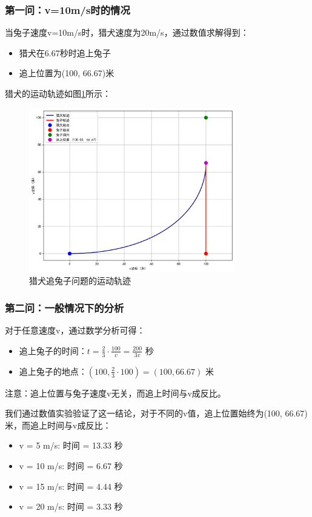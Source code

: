 \documentclass[bwprint]{cumcmthesis}
\begin{document}
\subsubsection{第一问：v=10m/s时的情况}
当兔子速度v=10m/s时，猎犬速度为20m/s，通过数值求解得到：
\begin{itemize}
    \item 猎犬在6.67秒时追上兔子
    \item 追上位置为(100, 66.67)米
\end{itemize}

猎犬的运动轨迹如图\ref{fig:dog_rabbit}所示：

\begin{figure}[htbp]
    \centering
    \includegraphics[width=0.8\textwidth]{figures/2.png}
    \caption{猎犬追兔子问题的运动轨迹}
    \label{fig:dog_rabbit}
\end{figure}

\subsubsection{第二问：一般情况下的分析}
对于任意速度v，通过数学分析可得：
\begin{itemize}
    \item 追上兔子的时间：$t = \frac{2}{3} \cdot \frac{100}{v} = \frac{200}{3v}$ 秒
    \item 追上兔子的地点：$(100, \frac{2}{3} \cdot 100) = (100, 66.67)$ 米
\end{itemize}

注意：追上位置与兔子速度v无关，而追上时间与v成反比。

我们通过数值实验验证了这一结论，对于不同的v值，追上位置始终为(100, 66.67)米，而追上时间与v成反比：
\begin{itemize}
    \item v = 5 m/s: 时间 = 13.33 秒
    \item v = 10 m/s: 时间 = 6.67 秒
    \item v = 15 m/s: 时间 = 4.44 秒
    \item v = 20 m/s: 时间 = 3.33 秒
\end{itemize}
\end{document}
